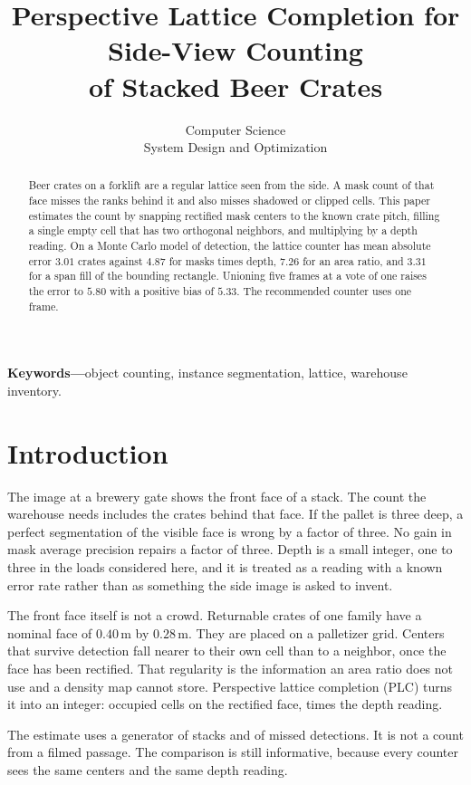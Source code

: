 \documentclass[10pt]{article}
\title{Perspective Lattice Completion for Side-View Counting\\ of Stacked Beer Crates}
\author{Computer Science\\ System Design and Optimization}
\date{}
\begin{document}
\maketitle

\begin{abstract}
Beer crates on a forklift are a regular lattice seen from the side. A mask count of that face misses the ranks behind it and also misses shadowed or clipped cells. This paper estimates the count by snapping rectified mask centers to the known crate pitch, filling a single empty cell that has two orthogonal neighbors, and multiplying by a depth reading. On a Monte Carlo model of detection, the lattice counter has mean absolute error $3.01$ crates against $4.87$ for masks times depth, $7.26$ for an area ratio, and $3.31$ for a span fill of the bounding rectangle. Unioning five frames at a vote of one raises the error to $5.80$ with a positive bias of $5.33$. The recommended counter uses one frame.
\end{abstract}

\noindent\textbf{Keywords---}object counting, instance segmentation, lattice, warehouse inventory.

\section{Introduction}
The image at a brewery gate shows the front face of a stack. The count the warehouse needs includes the crates behind that face. If the pallet is three deep, a perfect segmentation of the visible face is wrong by a factor of three. No gain in mask average precision repairs a factor of three. Depth is a small integer, one to three in the loads considered here, and it is treated as a reading with a known error rate rather than as something the side image is asked to invent.

The front face itself is not a crowd. Returnable crates of one family have a nominal face of $0.40\,\mathrm{m}$ by $0.28\,\mathrm{m}$. They are placed on a palletizer grid. Centers that survive detection fall nearer to their own cell than to a neighbor, once the face has been rectified. That regularity is the information an area ratio does not use and a density map cannot store. Perspective lattice completion (PLC) turns it into an integer: occupied cells on the rectified face, times the depth reading.

The estimate uses a generator of stacks and of missed detections. It is not a count from a filmed passage. The comparison is still informative, because every counter sees the same centers and the same depth reading.
\end{document}
